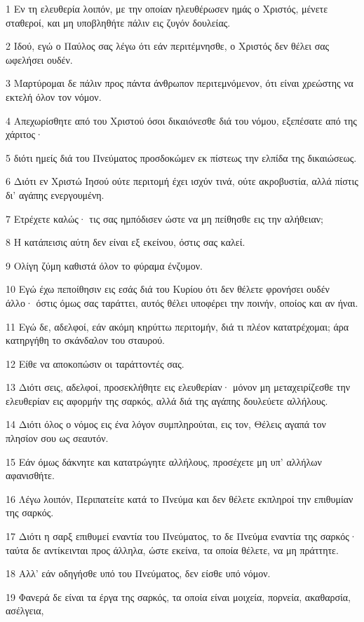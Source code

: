 \par 1 Εν τη ελευθερία λοιπόν, με την οποίαν ηλευθέρωσεν ημάς ο Χριστός, μένετε σταθεροί, και μη υποβληθήτε πάλιν εις ζυγόν δουλείας.
\par 2 Ιδού, εγώ ο Παύλος σας λέγω ότι εάν περιτέμνησθε, ο Χριστός δεν θέλει σας ωφελήσει ουδέν.
\par 3 Μαρτύρομαι δε πάλιν προς πάντα άνθρωπον περιτεμνόμενον, ότι είναι χρεώστης να εκτελή όλον τον νόμον.
\par 4 Απεχωρίσθητε από του Χριστού όσοι δικαιόνεσθε διά του νόμου, εξεπέσατε από της χάριτος·
\par 5 διότι ημείς διά του Πνεύματος προσδοκώμεν εκ πίστεως την ελπίδα της δικαιώσεως.
\par 6 Διότι εν Χριστώ Ιησού ούτε περιτομή έχει ισχύν τινά, ούτε ακροβυστία, αλλά πίστις δι' αγάπης ενεργουμένη.
\par 7 Ετρέχετε καλώς· τις σας ημπόδισεν ώστε να μη πείθησθε εις την αλήθειαν;
\par 8 Η κατάπεισις αύτη δεν είναι εξ εκείνου, όστις σας καλεί.
\par 9 Ολίγη ζύμη καθιστά όλον το φύραμα ένζυμον.
\par 10 Εγώ έχω πεποίθησιν εις εσάς διά του Κυρίου ότι δεν θέλετε φρονήσει ουδέν άλλο· όστις όμως σας ταράττει, αυτός θέλει υποφέρει την ποινήν, οποίος και αν ήναι.
\par 11 Εγώ δε, αδελφοί, εάν ακόμη κηρύττω περιτομήν, διά τι πλέον κατατρέχομαι; άρα κατηργήθη το σκάνδαλον του σταυρού.
\par 12 Είθε να αποκοπώσιν οι ταράττοντές σας.
\par 13 Διότι σεις, αδελφοί, προσεκλήθητε εις ελευθερίαν· μόνον μη μεταχειρίζεσθε την ελευθερίαν εις αφορμήν της σαρκός, αλλά διά της αγάπης δουλεύετε αλλήλους.
\par 14 Διότι όλος ο νόμος εις ένα λόγον συμπληρούται, εις τον, Θέλεις αγαπά τον πλησίον σου ως σεαυτόν.
\par 15 Εάν όμως δάκνητε και κατατρώγητε αλλήλους, προσέχετε μη υπ' αλλήλων αφανισθήτε.
\par 16 Λέγω λοιπόν, Περιπατείτε κατά το Πνεύμα και δεν θέλετε εκπληροί την επιθυμίαν της σαρκός.
\par 17 Διότι η σαρξ επιθυμεί εναντία του Πνεύματος, το δε Πνεύμα εναντία της σαρκός· ταύτα δε αντίκεινται προς άλληλα, ώστε εκείνα, τα οποία θέλετε, να μη πράττητε.
\par 18 Αλλ' εάν οδηγήσθε υπό του Πνεύματος, δεν είσθε υπό νόμον.
\par 19 Φανερά δε είναι τα έργα της σαρκός, τα οποία είναι μοιχεία, πορνεία, ακαθαρσία, ασέλγεια,
